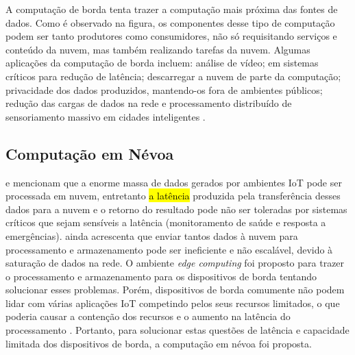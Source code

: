 A computação de borda tenta trazer a computação mais próxima das fontes de
dados.
Como é observado na figura, os
componentes desse tipo de computação podem ser tanto produtores como
consumidores, não só requisitando serviços e conteúdo da nuvem, mas também
realizando tarefas da nuvem.
Algumas aplicações da computação de borda incluem: análise de vídeo;
em sistemas críticos para redução de latência;
descarregar a nuvem de parte da computação;
privacidade dos dados produzidos, mantendo-os fora de ambientes públicos;
redução das cargas de dados na rede e
processamento distribuído de sensoriamento massivo em cidades inteligentes \cite{Shi2016}.


\subsection{Computação em Névoa}

 e 
mencionam que a enorme massa de dados gerados por ambientes IoT pode ser
processada em nuvem, entretanto \hl{a latência} produzida pela transferência desses
dados para a nuvem e o retorno do resultado pode não ser toleradas por sistemas
críticos que sejam sensíveis a latência (monitoramento de saúde e resposta a
emergências).
 ainda acrescenta que enviar tantos
dados à nuvem
para processamento e armazenamento pode ser ineficiente e não escalável, devido à
saturação de dados na rede.
O ambiente \emph{edge computing} foi proposto para trazer o
processamento e armazenamento para os dispositivos de borda tentando solucionar
esses problemas.
Porém, dispositivos de borda comumente não podem lidar com várias
aplicações IoT competindo pelos seus recursos limitados, o que poderia causar a
contenção dos recursos e o aumento na latência do processamento
\cite{Dastjerdi2016}. Portanto, para solucionar estas questões de latência e
capacidade limitada dos dispositivos de borda, a computação em névoa foi proposta.

